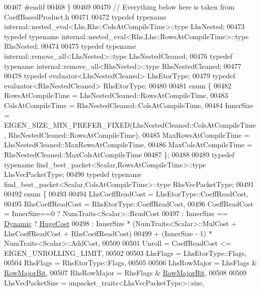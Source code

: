 \begin{DoxyCode}
00467 \textcolor{preprocessor}{#endif}
00468   \}
00469 
00470   \textcolor{comment}{// Everything below here is taken from CoeffBasedProduct.h}
00471 
00472   \textcolor{keyword}{typedef} \textcolor{keyword}{typename} internal::nested\_eval<Lhs,Rhs::ColsAtCompileTime>::type LhsNested;
00473   \textcolor{keyword}{typedef} \textcolor{keyword}{typename} internal::nested\_eval<Rhs,Lhs::RowsAtCompileTime>::type RhsNested;
00474   
00475   \textcolor{keyword}{typedef} \textcolor{keyword}{typename} internal::remove\_all<LhsNested>::type LhsNestedCleaned;
00476   \textcolor{keyword}{typedef} \textcolor{keyword}{typename} internal::remove\_all<RhsNested>::type RhsNestedCleaned;
00477 
00478   \textcolor{keyword}{typedef} evaluator<LhsNestedCleaned> LhsEtorType;
00479   \textcolor{keyword}{typedef} evaluator<RhsNestedCleaned> RhsEtorType;
00480 
00481   \textcolor{keyword}{enum} \{
00482     RowsAtCompileTime = LhsNestedCleaned::RowsAtCompileTime,
00483     ColsAtCompileTime = RhsNestedCleaned::ColsAtCompileTime,
00484     InnerSize = EIGEN\_SIZE\_MIN\_PREFER\_FIXED(LhsNestedCleaned::ColsAtCompileTime, 
      RhsNestedCleaned::RowsAtCompileTime),
00485     MaxRowsAtCompileTime = LhsNestedCleaned::MaxRowsAtCompileTime,
00486     MaxColsAtCompileTime = RhsNestedCleaned::MaxColsAtCompileTime
00487   \};
00488 
00489   \textcolor{keyword}{typedef} \textcolor{keyword}{typename} find\_best\_packet<Scalar,RowsAtCompileTime>::type LhsVecPacketType;
00490   \textcolor{keyword}{typedef} \textcolor{keyword}{typename} find\_best\_packet<Scalar,ColsAtCompileTime>::type RhsVecPacketType;
00491 
00492   \textcolor{keyword}{enum} \{
00493       
00494     LhsCoeffReadCost = LhsEtorType::CoeffReadCost,
00495     RhsCoeffReadCost = RhsEtorType::CoeffReadCost,
00496     CoeffReadCost = InnerSize==0 ? NumTraits<Scalar>::ReadCost
00497                   : InnerSize == \hyperlink{namespace_eigen_ad81fa7195215a0ce30017dfac309f0b2}{Dynamic} ? \hyperlink{namespace_eigen_a3163430a1c13173faffde69016b48aaf}{HugeCost}
00498                   : InnerSize * (NumTraits<Scalar>::MulCost + LhsCoeffReadCost + RhsCoeffReadCost)
00499                     + (InnerSize - 1) * NumTraits<Scalar>::AddCost,
00500 
00501     Unroll = CoeffReadCost <= EIGEN\_UNROLLING\_LIMIT,
00502     
00503     LhsFlags = LhsEtorType::Flags,
00504     RhsFlags = RhsEtorType::Flags,
00505     
00506     LhsRowMajor = LhsFlags & \hyperlink{group__flags_gae4f56c2a60bbe4bd2e44c5b19cbe8762}{RowMajorBit},
00507     RhsRowMajor = RhsFlags & \hyperlink{group__flags_gae4f56c2a60bbe4bd2e44c5b19cbe8762}{RowMajorBit},
00508 
00509     LhsVecPacketSize = unpacket\_traits<LhsVecPacketType>::size,

\end{DoxyCode}
